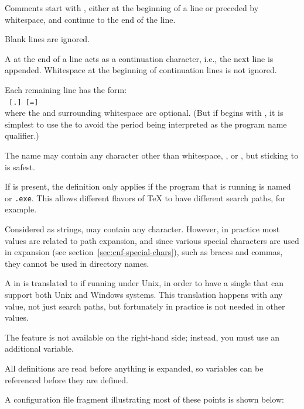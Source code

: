 \documentclass[12pt]{article}
\begin{document}
\begin{itemize*}
\item
  Comments start with \code{\%}, either at the beginning of a line or
  preceded by whitespace, and continue to the end of the line.
\item
  Blank lines are ignored.
\item
  A \bs{} at the end of a line acts as a continuation character,
  i.e., the next line is appended.  Whitespace at the beginning of
  continuation lines is not ignored.
\item
  Each remaining line has the form:\\
  \hspace*{2em}\texttt{ \textrm{[}.\textrm{]}
  \textrm{[}=\textrm{]} }\\[1pt]
  where the \samp{=} and surrounding whitespace are optional.
  (But if  begins with , it is simplest to use the
  \samp{=} to avoid the period being interpreted as the program name
  qualifier.)
\item
  The  name may contain any character other
  than whitespace, \samp{=}, or , but sticking to
   is safest.
\item
  If  is present, the definition only
  applies if the program that is running is named
  \texttt{} or \texttt{.exe}.  This allows
  different flavors of \TeX{} to have different search paths, for
  example.
\item Considered as strings,  may contain any character.
  However, in practice most  values are related to path
  expansion, and since various special characters are used in expansion
  (see section~\ref{sec:cnf-special-chars}), such as braces and commas,
  they cannot be used in directory names.
  
  A \samp{;} in  is translated to \samp{:} if running under
  Unix, in order to have a single  that can support both
  Unix and Windows systems. This translation happens with any value, not
  just search paths, but fortunately in practice \samp{;} is not needed
  in other values.
  
  The  feature is not available on the
  right-hand side; instead, you must use an additional variable.
  
\item
  All definitions are read before anything is expanded, so
  variables can be referenced before they are defined.
\end{itemize*}
A configuration file fragment illustrating most of these points is
\ifSingleColumn
shown below:
\end{document}
